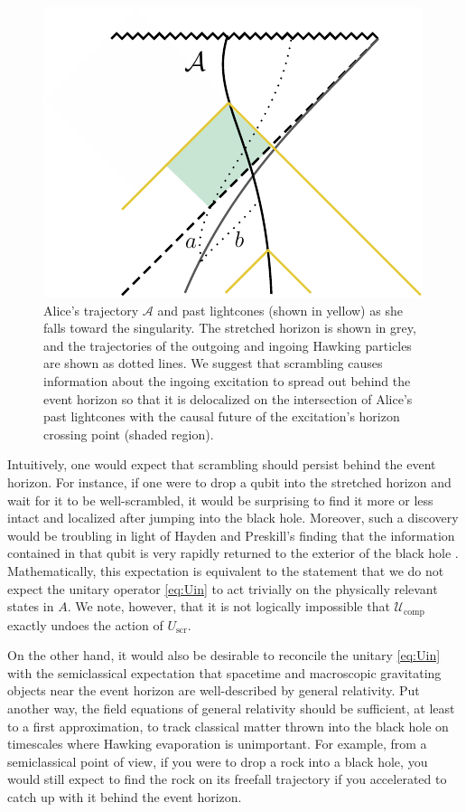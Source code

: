 \documentclass[a4paper,11pt]{article}
\theoremstyle{definition}
\begin{document}
\begin{figure}
\centering
\includegraphics[scale=1]{lightcones.pdf}
\caption{Alice's trajectory $\mathcal{A}$ and past lightcones (shown in yellow) as she falls toward the singularity.
The stretched horizon is shown in grey, and the trajectories of the outgoing and ingoing Hawking particles are shown as dotted lines.
We suggest that scrambling causes information about the ingoing excitation to spread out behind the event horizon so that it is delocalized on the intersection of Alice's past lightcones with the causal future of the excitation's horizon crossing point (shaded region).
}
\label{fig:lightcones}
\end{figure}

Intuitively, one would expect that scrambling should persist behind the event horizon.
For instance, if one were to drop a qubit into the stretched horizon and wait for it to be well-scrambled, it would be surprising to find it more or less intact and localized after jumping into the black hole.
Moreover, such a discovery would be troubling in light of Hayden and Preskill's finding that the information contained in that qubit is very rapidly returned to the exterior of the black hole \cite{Hayden:2007cs}.
Mathematically, this expectation is equivalent to the statement that we do not expect the unitary operator \eqref{eq:Uin} to act trivially on the physically relevant states in $A$.
We note, however, that it is not logically impossible that $\mathcal{U}_\mathrm{comp}$ exactly undoes the action of $U_\mathrm{scr}$.

On the other hand, it would also be desirable to reconcile the unitary \eqref{eq:Uin} with the semiclassical expectation that spacetime and macroscopic gravitating objects near the event horizon are well-described by general relativity.
Put another way, the field equations of general relativity should be sufficient, at least to a first approximation, to track classical matter thrown into the black hole on timescales where Hawking evaporation is unimportant.
For example, from a semiclassical point of view, if you were to drop a rock into a black hole, you would still expect to find the rock on its freefall trajectory if you accelerated to catch up with it behind the event horizon.
\end{document}
